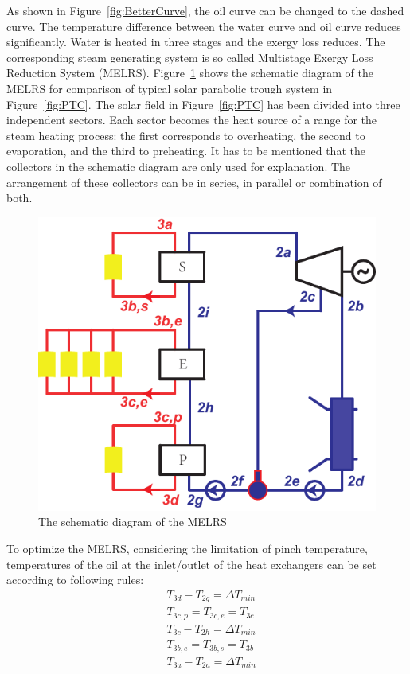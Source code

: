 As shown in Figure~\ref{fig:BetterCurve}, the oil curve can be changed to the dashed curve. The temperature difference between the water curve and oil curve reduces significantly. Water is heated in three stages and the exergy loss reduces. The corresponding steam generating system is so called Multistage Exergy Loss Reduction System (MELRS).
Figure~\ref{fig:SEP} shows the schematic diagram of the MELRS for comparison of typical solar parabolic trough system in Figure~\ref{fig:PTC}. The solar field in Figure~\ref{fig:PTC} has been divided into three independent sectors. Each sector becomes the heat source of a range for the steam heating process: the first corresponds to overheating, the second to evaporation, and the third to preheating. 
It has to be mentioned that the collectors in the schematic diagram are only used for explanation. The arrangement of these collectors can be in series, in parallel or combination of both.

\noindent \begin{figure}[htbp]
\begin{center}
	\includegraphics[width = 0.5\columnwidth]{fig/SEP}
	\caption{The schematic diagram of the MELRS}
	\label{fig:SEP}
\end{center}
\end{figure}

To optimize the MELRS, considering the limitation of pinch temperature, temperatures of the oil at the inlet/outlet of the heat exchangers can be set according to following rules:
\begin{eqnarray*}
	&T_{3d} - T_{2g} = \Delta T_{min}\\
   &T_{3c,p} = T_{3c,e} = T_{3c}\\
   &T_{3c} - T_{2h} = \Delta T_{min}\\
	&T_{3b,e} = T_{3b,s} = T_{3b}\\
	&T_{3a} - T_{2a} = \Delta T_{min}
\end{eqnarray*}


